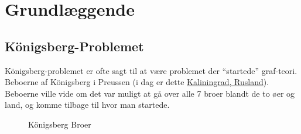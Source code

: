 \chapter{Grundlæggende}

\section{Königsberg-Problemet}%
\label{sec:label}

Königsberg-problemet er ofte sagt til at være problemet der ``startede'' graf-teori. Beboerne af Königsberg i Preussen (i dag er dette \href{https://en.wikipedia.org/wiki/Kaliningrad}{Kaliningrad, Rusland}). Beboerne ville vide om det var muligt at gå over alle 7 broer blandt de to øer og land, og komme tilbage til hvor man startede.

\begin{figure}[ht]
  \centering
{}
  \caption{\label{fig:konigsberg} Königsberg Broer}
\end{figure}




